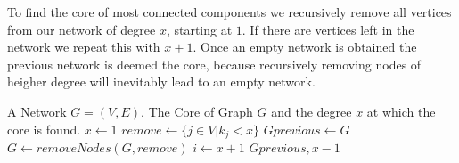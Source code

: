 To find the core of most connected components we recursively remove all vertices from our network of degree $x$, starting at $1$. If there are vertices left in the network we repeat this with $x+1$. Once an empty network is obtained the previous network is deemed the core, because  recursively removing nodes of heigher degree will inevitably lead to an empty network. 

\newcommand{\FindCore}{\ensuremath{\mbox{\sc FindCore}}}
\begin{algorithm}[h!]
\caption{$\FindCore(Network)$}\label{alg:findcore}
\begin{algorithmic}
\REQUIRE A Network $G=(V,E)$.
\ENSURE The Core of Graph $G$ and the degree $x$ at which the core is found.
\medskip
\STATE $x\gets 1$
	\STATE $remove\gets \{j\in V | k_j<x\}$
	\STATE $Gprevious \gets G$
		\STATE $G\gets removeNodes(G, remove)$ 
	\ENDWHILE
	\STATE $i \gets x+1$
\ENDWHILE
\RETURN $Gprevious, x-1$
\end{algorithmic}
\end{algorithm}

%